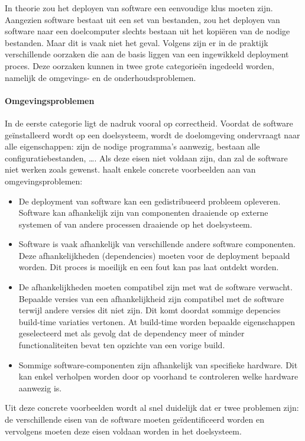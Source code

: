 In theorie zou het deployen van software een eenvoudige klus moeten zijn.
Aangezien software bestaat uit een set van bestanden, zou het deployen van software naar een doelcomputer slechts bestaan uit het kopiëren van de nodige bestanden.
Maar dit is vaak niet het geval.
Volgens \citet{dolstra2006purely} zijn er in de praktijk verschillende oorzaken die aan de basis liggen van een ingewikkeld deployment proces.
Deze oorzaken kunnen in twee grote categorieën ingedeeld worden, namelijk de omgevings- en de onderhoudsproblemen.

\paragraph{Omgevingsproblemen}
In de eerste categorie ligt de nadruk vooral op correctheid.
Voordat de software geïnstalleerd wordt op een doelsysteem, wordt de doelomgeving ondervraagt naar alle eigenschappen: zijn de nodige programma's aanwezig, bestaan alle configuratiebestanden, \ldots .
Als deze eisen niet voldaan zijn, dan zal de software niet werken zoals gewenst.
\citet{dolstra2006purely} haalt enkele concrete voorbeelden aan van omgevingsproblemen:
\begin{itemize}
\item De deployment van software kan een gedistribueerd probleem opleveren.
Software kan afhankelijk zijn van componenten draaiende op externe systemen of van andere processen draaiende op het doelsysteem.  
\item Software is vaak afhankelijk van verschillende andere software componenten. 
Deze afhankelijkheden (dependencies) moeten voor de deployment bepaald worden.
Dit proces is moeilijk en een fout kan pas laat ontdekt worden.
\item De afhankelijkheden moeten compatibel zijn met wat de software verwacht.
Bepaalde versies van een afhankelijkheid zijn compatibel met de software terwijl andere versies dit niet zijn.
Dit komt doordat sommige depencies build-time variaties vertonen.
At build-time worden bepaalde eigenschappen geselecteerd met als gevolg dat de dependency meer of minder functionaliteiten bevat ten opzichte van een vorige build.
\item Sommige software-componenten zijn afhankelijk van specifieke hardware.
Dit kan enkel verholpen worden door op voorhand te controleren welke hardware aanwezig is.
\end{itemize}

Uit deze concrete voorbeelden wordt al snel duidelijk dat er twee problemen zijn: de verschillende eisen van de software moeten geïdentificeerd worden en vervolgens moeten deze eisen voldaan worden in het doelsysteem.

